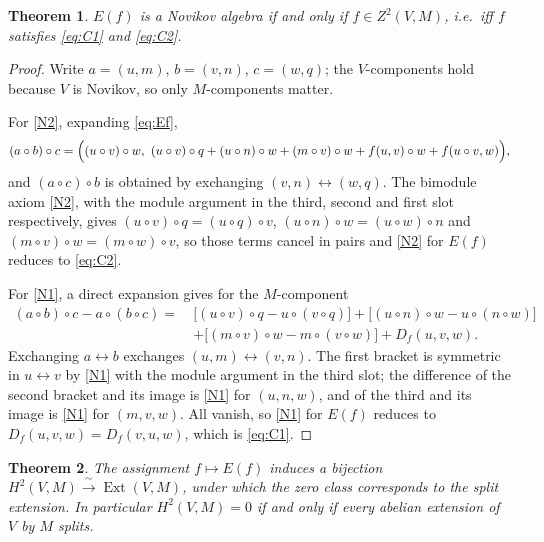 \documentclass[11pt,reqno]{amsart}
\theoremstyle{plain}
\newtheorem{theorem}{Theorem}[section]
\theoremstyle{definition}
\DeclareMathOperator{\Ext}{Ext}
\newcommand{\Zt}{Z^2}
\newcommand{\Ht}{H^2}
\begin{document}
\begin{theorem}\label{thm:ext-cocycle}
$E(f)$ is a Novikov algebra if and only if $f\in\Zt(V,M)$, i.e.\ iff $f$ satisfies
\eqref{eq:C1} and \eqref{eq:C2}.
\end{theorem}

\begin{proof}
Write $a=(u,m)$, $b=(v,n)$, $c=(w,q)$; the $V$-components hold because $V$ is Novikov, so
only $M$-components matter.

For \eqref{N2}, expanding \eqref{eq:Ef},
\[
(a\circ b)\circ c=\Bigl((u\circ v)\circ w,\ (u\circ v)\circ q+(u\circ n)\circ w
+(m\circ v)\circ w+f(u,v)\circ w+f(u\circ v,w)\Bigr),
\]
and $(a\circ c)\circ b$ is obtained by exchanging $(v,n)\leftrightarrow(w,q)$. The bimodule
axiom \eqref{N2}, with the module argument in the third, second and first slot respectively,
gives $(u\circ v)\circ q=(u\circ q)\circ v$, $(u\circ n)\circ w=(u\circ w)\circ n$ and
$(m\circ v)\circ w=(m\circ w)\circ v$, so those terms cancel in pairs and \eqref{N2} for
$E(f)$ reduces to \eqref{eq:C2}.

For \eqref{N1}, a direct expansion gives for the $M$-component
\begin{align*}
(a\circ b)\circ c-a\circ(b\circ c)
=\ &\bigl[(u\circ v)\circ q-u\circ(v\circ q)\bigr]
+\bigl[(u\circ n)\circ w-u\circ(n\circ w)\bigr]\\
&+\bigl[(m\circ v)\circ w-m\circ(v\circ w)\bigr]+D_f(u,v,w).
\end{align*}
Exchanging $a\leftrightarrow b$ exchanges $(u,m)\leftrightarrow(v,n)$. The first bracket is
symmetric in $u\leftrightarrow v$ by \eqref{N1} with the module argument in the third slot;
the difference of the second bracket and its image is \eqref{N1} for $(u,n,w)$, and of the
third and its image is \eqref{N1} for $(m,v,w)$. All vanish, so \eqref{N1} for $E(f)$
reduces to $D_f(u,v,w)=D_f(v,u,w)$, which is \eqref{eq:C1}.
\end{proof}

\begin{theorem}\label{thm:ext-bijection}
The assignment $f\mapsto E(f)$ induces a bijection
$\Ht(V,M)\xrightarrow{\ \sim\ }\Ext(V,M)$, under which the zero class corresponds to the
split extension. In particular $\Ht(V,M)=0$ if and only if every abelian extension of $V$ by
$M$ splits.
\end{theorem}
\end{document}
